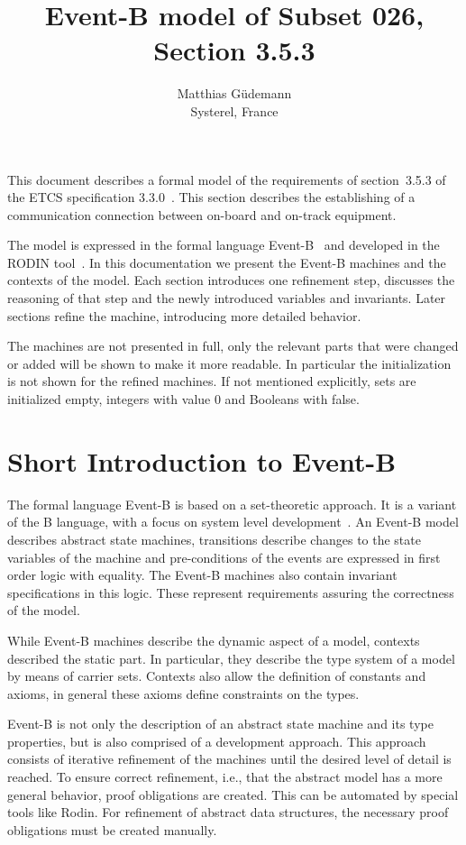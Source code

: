 \documentclass[10pt,a4paper]{article}
\author{Matthias Güdemann\\Systerel, France}
\title{Event-B model of Subset 026, Section 3.5.3}
\date{}
\begin{document}
\maketitle

This document describes a formal model of the requirements of section~3.5.3 of
the ETCS specification 3.3.0~\cite{ETCS}. This section describes the
establishing of a communication connection between on-board and on-track
equipment.

The model is expressed in the formal language Event-B~\cite{eventB} and
developed in the RODIN tool~\cite{rodin}. In this documentation we present the
Event-B machines and the contexts of the model. Each section introduces one
refinement step, discusses the reasoning of that step and the newly introduced
variables and invariants. Later sections refine the machine, introducing more
detailed behavior.

The machines are not presented in full, only the relevant parts that were
changed or added will be shown to make it more readable. In particular the
initialization is not shown for the refined machines. If not mentioned
explicitly, sets are initialized empty, integers with value 0 and Booleans with
false.


\section{Short Introduction to Event-B}
\label{sec:short-intr-event}

The formal language Event-B is based on a set-theoretic approach. It is a
variant of the B language, with a focus on system level
development~\cite{eventbbook}. An Event-B model describes abstract state
machines, transitions describe changes to the state variables of the machine and
pre-conditions of the events are expressed in first order logic with
equality. The Event-B machines also contain invariant specifications in this
logic. These represent requirements assuring the correctness of the model.

While Event-B machines describe the dynamic aspect of a model, contexts
described the static part. In particular, they describe the type system of a
model by means of carrier sets. Contexts also allow the definition of constants
and axioms, in general these axioms define constraints on the types.

Event-B is not only the description of an abstract state machine and its type
properties, but is also comprised of a development approach. This approach
consists of iterative refinement of the machines until the desired level of
detail is reached. To ensure correct refinement, i.e., that the abstract model
has a more general behavior, proof obligations are created. This can be
automated by special tools like Rodin. For refinement of abstract data
structures, the necessary proof obligations must be created manually.
\end{document}
